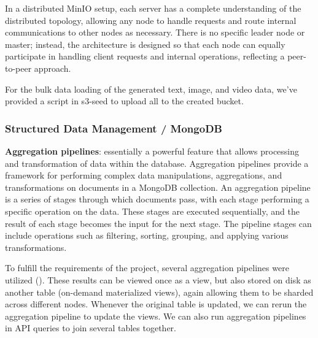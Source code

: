 \documentclass{report}
\begin{document}
    In a distributed MinIO setup, each server has a complete understanding of the distributed topology, allowing any node to handle requests and route internal communications to other nodes as necessary. There is no specific leader node or master; instead, the architecture is designed so that each node can equally participate in handling client requests and internal operations, reflecting a peer-to-peer approach.

    For the bulk data loading of the generated text, image, and video data, we've provided a script in s3-seed to upload all to the created bucket.

    \subsubsection{Structured Data Management / MongoDB}
    \textbf{Aggregation pipelines}: essentially a powerful feature that allows processing and transformation of data within the database. Aggregation pipelines provide a framework for performing complex data manipulations, aggregations, and transformations on documents in a MongoDB collection. An aggregation pipeline is a series of stages through which documents pass, with each stage performing a specific operation on the data. These stages are executed sequentially, and the result of each stage becomes the input for the next stage. The pipeline stages can include operations such as filtering, sorting, grouping, and applying various transformations.

    To fulfill the requirements of the project, several aggregation pipelines were utilized (). These results can be viewed once as a view, but also stored on disk as another table (on-demand materialized views), again allowing them to be sharded across different nodes. Whenever the original table is updated, we can rerun the aggregation pipeline to update the views. We can also run aggregation pipelines in API queries to join several tables together.
\end{document}
